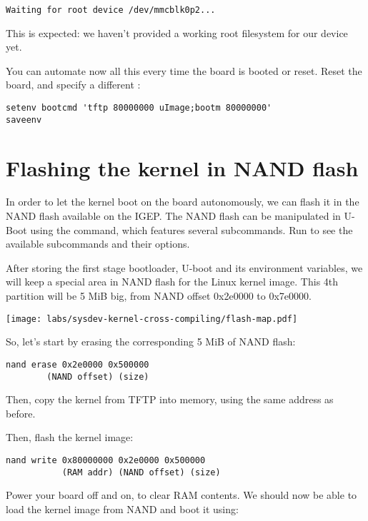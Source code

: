 \begin{verbatim}
Waiting for root device /dev/mmcblk0p2...
\end{verbatim}

This is expected: we haven't provided a working root filesystem for
our device yet.

You can automate now all this every time the board is booted or
reset. Reset the board, and specify a different :

\begin{verbatim}
setenv bootcmd 'tftp 80000000 uImage;bootm 80000000'
saveenv
\end{verbatim}

\section{Flashing the kernel in NAND flash}

In order to let the kernel boot on the board autonomously, we can
flash it in the NAND flash available on the IGEP. The NAND flash can
be manipulated in U-Boot using the  command, which
features several subcommands. Run  to see the
available subcommands and their options.

After storing the first stage bootloader, U-boot and its environment
variables, we will keep a special area in NAND flash for the Linux
kernel image.  This 4th partition will be 5 MiB big, from NAND offset
0x2e0000 to 0x7e0000.

\begin{center}
  \texttt{[image: labs/sysdev-kernel-cross-compiling/flash-map.pdf]}
\end{center}

So, let's start by erasing the corresponding 5 MiB of NAND flash:

\begin{verbatim}
nand erase 0x2e0000 0x500000
        (NAND offset) (size)
\end{verbatim}

Then, copy the kernel from TFTP into memory, using the same address as
before.

Then, flash the kernel image:

\begin{verbatim}
nand write 0x80000000 0x2e0000 0x500000
           (RAM addr) (NAND offset) (size)
\end{verbatim}

Power your board off and on, to clear RAM contents. We should now be
able to load the kernel image from NAND and boot it using:

